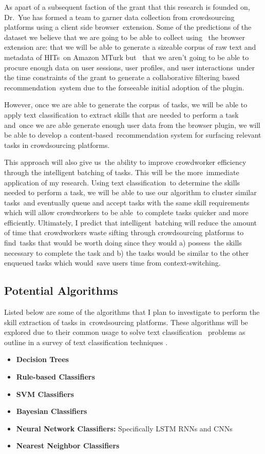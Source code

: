 \documentclass[letterpaper,12pt]{article}
\begin{document}
As apart of a subsequent faction of the grant that this research is founded on, Dr.\
Yue has formed a team to garner data collection from crowdsourcing platforms using a client side browser\
extension. Some of the predictions of the dataset we believe that we are going to be able to collect using \
the browser extension are: that we will be able to generate a sizeable corpus of raw text and metadata of HITs\
on Amazon MTurk but \
that we aren't going to be able to procure enough data on user sessions, user profiles, and user interactions\
under the time constraints of the grant to generate a collaborative filtering based recommendation\
system due to the forseeable initial adoption of the plugin. 

However, once we are able to generate the corpus\
of tasks, we will be able to apply text classification to extract skills that are needed to perform a task and\
once we are able generate enough user data from the browser plugin, we will be able to develop a content-based\
recommendation system for surfacing relevant tasks in crowdsourcing platforms. 

This approach will also give us\
the ability to improve crowdworker efficiency through the intelligent batching of tasks. This will be the more\
immediate application of my research. Using text classification\
to determine the skills needed to perform a task, we will be able to use our algorithm to cluster similar tasks\
and eventually queue and accept tasks with the same skill requirements which will allow crowdworkers to be able\
to complete tasks quicker and more efficiently. Ultimately, I predict that intelligent\
batching will reduce the amount of time that crowdworkers waste sifting through crowdsourcing platforms to find\
tasks that would be worth doing since they would a) possess\
the skills necessary to complete the task and b) the tasks would be similar to the other enqueued tasks which would\
save users time from context-switching.
\subsection{Potential Algorithms}
Listed below are some of the algorithms that I plan to investigate to perform the skill extraction of tasks in\
crowdsourcing platforms. These algorithms will be explored due to their common usage to solve text classification \
problems as outline in a survey of text classification techniques \cite{aggarwal2012survey}.
\begin{itemize}
	\item \textbf{Decision Trees}
	\item \textbf{Rule-based Classifiers}
	\item \textbf{SVM Classifiers}
	\item \textbf{Bayesian Classifiers}
	\item \textbf{Neural Network Classifiers:} Specifically LSTM RNNs and CNNs
	\item \textbf{Nearest Neighbor Classifiers}
\end{itemize}
\end{document}
